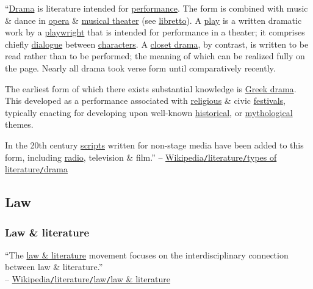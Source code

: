 \documentclass[oneside]{book}
\numberwithin{equation}{section}
\begin{document}
``\href{https://en.wikipedia.org/wiki/Drama}{Drama} is literature intended for \href{https://en.wikipedia.org/wiki/Performance}{performance}. The form is combined with music \& dance in \href{https://en.wikipedia.org/wiki/Opera}{opera} \& \href{https://en.wikipedia.org/wiki/Musical_theatre}{musical theater} (see \href{https://en.wikipedia.org/wiki/Libretto}{libretto}). A \href{https://en.wikipedia.org/wiki/Play_(theatre)}{play} is a written dramatic work by a \href{https://en.wikipedia.org/wiki/Playwright}{playwright} that is intended for performance in a theater; it comprises chiefly \href{https://en.wikipedia.org/wiki/Dialogue}{dialogue} between \href{https://en.wikipedia.org/wiki/Fictional_character}{characters}. A \href{https://en.wikipedia.org/wiki/Closet_drama}{closet drama}, by contrast, is written to be read rather than to be performed; the meaning of which can be realized fully on the page. Nearly all drama took verse form until comparatively recently.

The earliest form of which there exists substantial knowledge is \href{https://en.wikipedia.org/wiki/Greek_theatre}{Greek drama}. This developed as a performance associated with \href{https://en.wikipedia.org/wiki/Religion}{religious} \& civic \href{https://en.wikipedia.org/wiki/Festival}{festivals}, typically enacting for developing upon well-known \href{https://en.wikipedia.org/wiki/History}{historical}, or \href{https://en.wikipedia.org/wiki/Mythology}{mythological} themes.

In the 20th century \href{https://en.wikipedia.org/wiki/Screenplay}{scripts} written for non-stage media have been added to this form, including \href{https://en.wikipedia.org/wiki/Radio_drama}{radio}, television \& film.'' -- \href{https://en.wikipedia.org/wiki/Literature#Drama}{Wikipedia\texttt{/}literature\texttt{/}types of literature\texttt{/}drama}

\subsection{Law}

\subsubsection{Law \& literature}
``The \href{https://en.wikipedia.org/wiki/Law_and_literature}{law \& literature} movement focuses on the interdisciplinary connection between law \& literature.''\\-- \href{https://en.wikipedia.org/wiki/Literature#Law_and_literature}{Wikipedia\texttt{/}literature\texttt{/}law\texttt{/}law \& literature}
\end{document}
